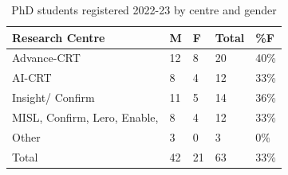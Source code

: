 
\begin{table}[!htb]
\colorbox{SwanOrange!10}{
      \begin{minipage}{14.2cm}
\caption{PhD students registered 2022-23
by centre and gender}
\label{tab:phdregistrations2223}
\footnotesize 



\begin{tabular}{p{6cm}
                R{1cm}
                R{1cm}           
                R{1cm}
                R{1cm}
                }
\toprule                 
\textmd{Research Centre}&
\textmd{M}&
\textmd{F}&
\textmd{Total}&
\textmd{\%F}\\ 
\midrule 
Advance-CRT&
12& 8& 20& 40\%\\
AI-CRT&
8& 4& 12& 33\%\\
Insight/ Confirm&
11& 5& 14& 36\%\\
MISL, Confirm, Lero, Enable,  &
8& 4& 12& 33\%\\
Other&
3& 0& 3& 0\%\\ 
\midrule 

Total&
42& 21& 63& 33\%\\

\bottomrule 
\end{tabular}

\end{minipage} 
}

\end{table}


